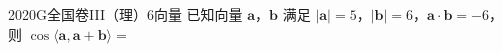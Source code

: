 
\begin{problem}{2020}{G}{全国卷III（理）}{6}{向量}
已知向量 $ \boldsymbol{a} $，$ \boldsymbol{b} $ 满足 $ |\boldsymbol{a}| = 5 $，$ |\boldsymbol{b}| = 6 $，$ \boldsymbol{a} \cdot \boldsymbol{b} = -6 $，则 $ \cos\langle \boldsymbol{a}, \boldsymbol{a} + \boldsymbol{b} \rangle = $
\begin{choices}
\end{choices}
\end{problem}

\begin{answer}

\end{answer}

\begin{solutions}

\end{solutions}